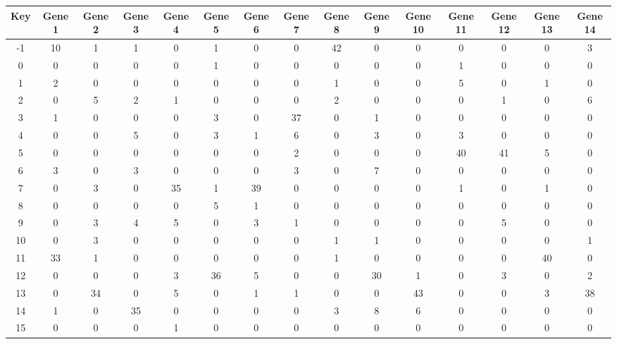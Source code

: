 \begin{tabular}{|c|c|c|c|c|c|c|c|c|c|c|c|c|c|c|}
\hline
Key & Gene 1 & Gene 2 & Gene 3 & Gene 4 & Gene 5 & Gene 6 & Gene 7 & Gene 8 & Gene 9 & Gene 10 & Gene 11 & Gene 12 & Gene 13 & Gene 14 \\
\hline
-1 & 10 & 1 & 1 & 0 & 1 & 0 & 0 & 42 & 0 & 0 & 0 & 0 & 0 & 3 \\
0 & 0 & 0 & 0 & 0 & 1 & 0 & 0 & 0 & 0 & 0 & 1 & 0 & 0 & 0 \\
1 & 2 & 0 & 0 & 0 & 0 & 0 & 0 & 1 & 0 & 0 & 5 & 0 & 1 & 0 \\
2 & 0 & 5 & 2 & 1 & 0 & 0 & 0 & 2 & 0 & 0 & 0 & 1 & 0 & 6 \\
3 & 1 & 0 & 0 & 0 & 3 & 0 & 37 & 0 & 1 & 0 & 0 & 0 & 0 & 0 \\
4 & 0 & 0 & 5 & 0 & 3 & 1 & 6 & 0 & 3 & 0 & 3 & 0 & 0 & 0 \\
5 & 0 & 0 & 0 & 0 & 0 & 0 & 2 & 0 & 0 & 0 & 40 & 41 & 5 & 0 \\
6 & 3 & 0 & 3 & 0 & 0 & 0 & 3 & 0 & 7 & 0 & 0 & 0 & 0 & 0 \\
7 & 0 & 3 & 0 & 35 & 1 & 39 & 0 & 0 & 0 & 0 & 1 & 0 & 1 & 0 \\
8 & 0 & 0 & 0 & 0 & 5 & 1 & 0 & 0 & 0 & 0 & 0 & 0 & 0 & 0 \\
9 & 0 & 3 & 4 & 5 & 0 & 3 & 1 & 0 & 0 & 0 & 0 & 5 & 0 & 0 \\
10 & 0 & 3 & 0 & 0 & 0 & 0 & 0 & 1 & 1 & 0 & 0 & 0 & 0 & 1 \\
11 & 33 & 1 & 0 & 0 & 0 & 0 & 0 & 1 & 0 & 0 & 0 & 0 & 40 & 0 \\
12 & 0 & 0 & 0 & 3 & 36 & 5 & 0 & 0 & 30 & 1 & 0 & 3 & 0 & 2 \\
13 & 0 & 34 & 0 & 5 & 0 & 1 & 1 & 0 & 0 & 43 & 0 & 0 & 3 & 38 \\
14 & 1 & 0 & 35 & 0 & 0 & 0 & 0 & 3 & 8 & 6 & 0 & 0 & 0 & 0 \\
15 & 0 & 0 & 0 & 1 & 0 & 0 & 0 & 0 & 0 & 0 & 0 & 0 & 0 & 0 \\
\hline
\end{tabular}